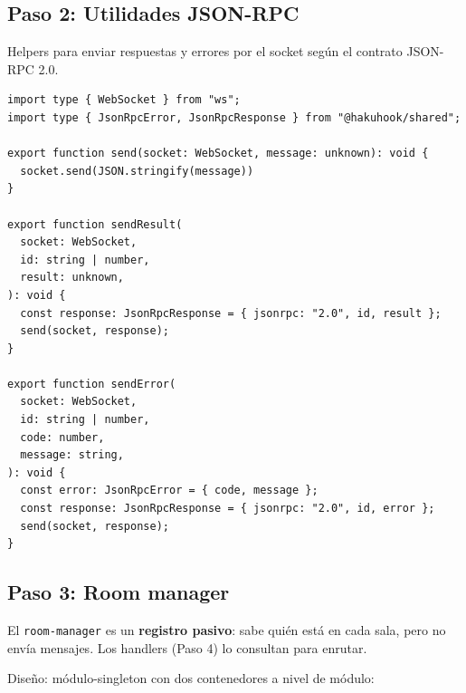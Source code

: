 \documentclass[11pt,a4paper]{article}
\begin{document}
\subsection{Paso 2: Utilidades JSON-RPC}

Helpers para enviar respuestas y errores por el socket según el contrato JSON-RPC 2.0.

\begin{lstlisting}[caption=packages/gateway-hub/src/json-rpc.ts]
import type { WebSocket } from "ws";
import type { JsonRpcError, JsonRpcResponse } from "@hakuhook/shared";

export function send(socket: WebSocket, message: unknown): void {
  socket.send(JSON.stringify(message))
}

export function sendResult(
  socket: WebSocket,
  id: string | number,
  result: unknown,
): void {
  const response: JsonRpcResponse = { jsonrpc: "2.0", id, result };
  send(socket, response);
}

export function sendError(
  socket: WebSocket,
  id: string | number,
  code: number,
  message: string,
): void {
  const error: JsonRpcError = { code, message };
  const response: JsonRpcResponse = { jsonrpc: "2.0", id, error };
  send(socket, response);
}
\end{lstlisting}

\subsection{Paso 3: Room manager}

El \texttt{room-manager} es un \textbf{registro pasivo}: sabe quién está en cada
sala, pero no envía mensajes. Los handlers (Paso 4) lo consultan para enrutar.

Diseño: módulo-singleton con dos contenedores a nivel de módulo:
\end{document}
